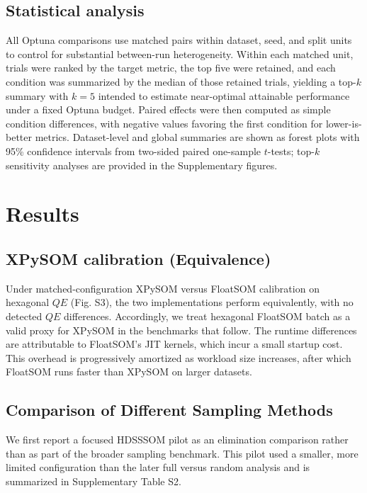 \documentclass[11pt]{article}
\begin{document}
\subsection{Statistical analysis}

All Optuna comparisons use matched pairs within dataset, seed, and split units to control for substantial between-run heterogeneity. Within each matched unit, trials were ranked by the target metric, the top five were retained, and each condition was summarized by the median of those retained trials, yielding a top-$k$ summary with $k=5$ intended to estimate near-optimal attainable performance under a fixed Optuna budget. Paired effects were then computed as simple condition differences, with negative values favoring the first condition for lower-is-better metrics. Dataset-level and global summaries are shown as forest plots with 95\% confidence intervals from two-sided paired one-sample $t$-tests; top-$k$ sensitivity analyses are provided in the Supplementary figures.

\section{Results}

\subsection{XPySOM calibration (Equivalence)}

Under matched-configuration XPySOM versus FloatSOM calibration on hexagonal $QE$ (Fig. S3), the two implementations perform equivalently, with no detected $QE$ differences. Accordingly, we treat hexagonal FloatSOM batch as a valid proxy for XPySOM in the benchmarks that follow. The runtime differences are attributable to FloatSOM's JIT kernels, which incur a small startup cost. This overhead is progressively amortized as workload size increases, after which FloatSOM runs faster than XPySOM on larger datasets.

\subsection{Comparison of Different Sampling Methods}

We first report a focused HDSSSOM pilot as an elimination comparison rather than as part of the broader sampling benchmark. This pilot used a smaller, more limited configuration than the later full versus random analysis and is summarized in Supplementary Table S2.
\end{document}
